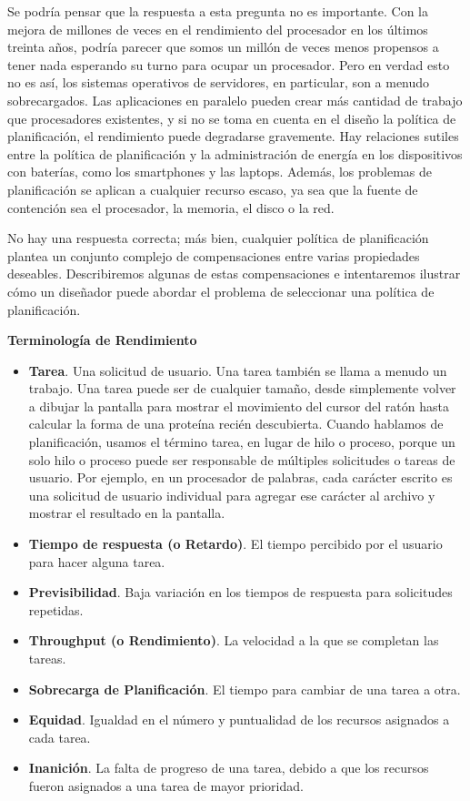 \documentclass[10pt]{book}
\begin{document}
Se podría pensar que la respuesta a esta pregunta no es importante. Con la mejora de millones de veces en el rendimiento del procesador en los últimos treinta años, podría parecer que somos un millón de veces menos propensos a tener nada esperando su turno para ocupar un procesador. Pero en verdad esto no es así, los sistemas operativos de servidores, en particular, son a menudo sobrecargados. Las aplicaciones en paralelo pueden crear más cantidad de trabajo que procesadores existentes, y si no se toma en cuenta en el diseño la política de planificación, el rendimiento puede degradarse gravemente. Hay relaciones sutiles entre la política de planificación y la administración de energía en los dispositivos con baterías, como los smartphones y las laptops. Además, los problemas de planificación se aplican a cualquier recurso escaso, ya sea que la fuente de contención sea el procesador, la memoria, el disco o la red.

No hay una respuesta correcta; más bien, cualquier política de planificación plantea un conjunto complejo de compensaciones entre varias propiedades deseables. Describiremos algunas de estas compensaciones e intentaremos ilustrar cómo un diseñador puede abordar el problema de seleccionar una política de planificación.

\textbf{Terminología de Rendimiento}

\begin{itemize}
\item \textbf{Tarea}. Una solicitud de usuario. Una tarea también se llama a menudo un trabajo. Una tarea puede ser de cualquier tamaño, desde simplemente volver a dibujar la pantalla para mostrar el movimiento del cursor del ratón hasta calcular la forma de una proteína recién descubierta. Cuando hablamos de planificación, usamos el término tarea, en lugar de hilo o proceso, porque un solo hilo o proceso puede ser responsable de múltiples solicitudes o tareas de usuario. Por ejemplo, en un procesador de palabras, cada carácter escrito es una solicitud de usuario individual para agregar ese carácter al archivo y mostrar el resultado en la pantalla.
\item \textbf{Tiempo de respuesta (o Retardo)}. El tiempo percibido por el usuario para hacer alguna tarea.
\item \textbf{Previsibilidad}. Baja variación en los tiempos de respuesta para solicitudes repetidas.
\item \textbf{Throughput (o Rendimiento)}. La velocidad a la que se completan las tareas.
\item \textbf{Sobrecarga de Planificación}. El tiempo para cambiar de una tarea a otra.
\item \textbf{Equidad}. Igualdad en el número y puntualidad de los recursos asignados a cada tarea.
\item \textbf{Inanición}. La falta de progreso de una tarea, debido a que los recursos fueron asignados a una tarea de mayor prioridad.
\end{itemize}
\end{document}
